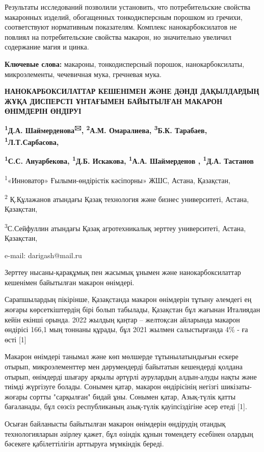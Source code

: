 Результаты исследований позволили установить, что потребительские
свойства макаронных изделий, обогащенных тонкодисперсным порошком из
гречихи, соответствуют нормативным показателям. Комплекс
нанокарбоксилатов не повлиял на потребительские свойства макарон, но
значительно увеличил содержание магия и цинка.

{\bfseries Ключевые слова:} макароны, тонкодисперсный порошок,
нанокарбоксилаты, микроэлементы, чечевичная мука, гречневая мука.

{\bfseries НАНОКАРБОКСИЛАТТАР КЕШЕНІМЕН ЖӘНЕ ДӘНДІ ДАҚЫЛДАРДЫҢ ЖҰҚА
ДИСПЕРСТІ ҰНТАҒЫМЕН БАЙЫТЫЛҒАН МАКАРОН ӨНІМДЕРІН ӨНДІРУІ}

{\bfseries \textsuperscript{1}Д.А. Шаймерденова\textsuperscript{🖂},
\textsuperscript{2}А.М. Омаралиева, \textsuperscript{3}Б.К. Тарабаев,
\textsuperscript{1}Л.Т.Сарбасова,}

{\bfseries \textsuperscript{1}С.С. Ануарбекова, \textsuperscript{1}Д.Б.
Искакова, \textsuperscript{1}А.А. Шаймерденов , \textsuperscript{1}Д.А.
Тастанов}

\textsuperscript{1}«Инноватор» Ғылыми-өндірістік кәсіпорны» ЖШС, Астана,
Қазақстан,

\textsuperscript{2} Қ.Құлажанов атындағы Қазақ технология және бизнес
университеті, Астана, Қазақстан,

\textsuperscript{3}С.Сейфуллин атындағы Қазақ агротехникалық зерттеу
университеті, Астана, Қазақстан,

e-mail: darigash@mail.ru

Зерттеу нысаны-қарақұмық пен жасымық ұнымен және нанокарбоксилаттар
кешенімен байытылған макарон өнімдері.

Сарапшылардың пікірінше, Қазақстанда макарон өнімдерін тұтыну әлемдегі
ең жоғары көрсеткіштердің бірі болып табылады, Қазақстан бұл жағынан
Италиядан кейін екінші орында. 2022 жылдың қаңтар -- желтоқсан айларында
макарон өндірісі 166,1 мың тоннаны құрады, бұл 2021 жылмен салыстырғанда
4\% - ға өсті {[}1{]}

Макарон өнімдері танымал және көп мөлшерде тұтынылатындығын ескере
отырып, микроэлементтер мен дәрумендерді байытатын кешендерді қолдана
отырып, өнімдерді шығару арқылы әртүрлі аурулардың алдын-алуды нақты
және тиімді жүргізуге болады. Сонымен қатар, макарон өндірісінің негізгі
шикізаты-жоғары сортты "сарқылған" бидай ұны. Сонымен қатар, Азық-түлік
қатты бағаланады, бұл сөзсіз республиканың азық-түлік қауіпсіздігіне
әсер етеді {[}1{]}.

Осыған байланысты байытылған макарон өнімдерін өндірудің отандық
технологияларын әзірлеу қажет, бұл өзіндік құнын төмендету есебінен
олардың бәсекеге қабілеттілігін арттыруға мүмкіндік береді.

